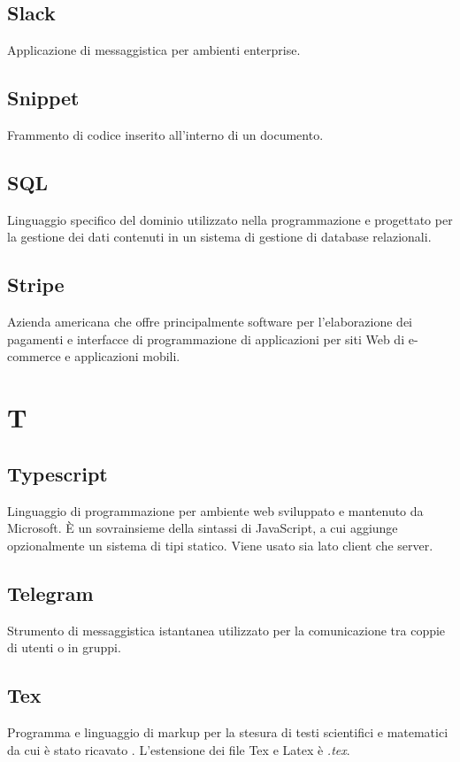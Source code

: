 \subsection*{Slack}
Applicazione di messaggistica per ambienti enterprise.

\subsection*{Snippet}
Frammento di codice inserito all'interno di un documento.

\subsection*{SQL}
Linguaggio specifico del dominio utilizzato nella programmazione e progettato per la gestione dei dati contenuti in un sistema di gestione di database relazionali.

\subsection*{Stripe}
Azienda americana che offre principalmente software per l'elaborazione dei pagamenti e interfacce di programmazione di applicazioni per siti Web di e-commerce e applicazioni mobili.

\newpage
\section{T}
\subsection*{Typescript}
Linguaggio di programmazione per ambiente web sviluppato e mantenuto da Microsoft. È un sovrainsieme della sintassi di JavaScript, a cui aggiunge opzionalmente un sistema di tipi statico. Viene usato sia lato client che server.

\subsection*{Telegram}
Strumento di messaggistica istantanea utilizzato per la comunicazione tra coppie di utenti o in gruppi.

\subsection*{Tex}
Programma e linguaggio di markup per la stesura di testi scientifici e matematici da cui è stato ricavato . L'estensione dei file Tex e Latex è \textit{.tex}.

